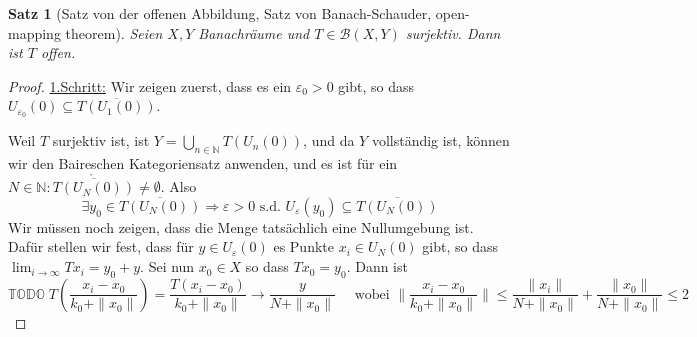 \documentclass[ngerman]{report}
\theoremstyle{plain}%
\newtheorem{thm}{Satz}[chapter]
\theoremstyle{definition}%
\theoremstyle{myStyle}
\newcommand{\N}{\mathbb{N}}
\newcommand{\BS}[1][X,Y]{\mathcal{B}(#1)} %
\newcommand{\norm}[1]{\|#1\|}
\newcommand{\df}[1][]{%
	\overset{#1}{\Rightarrow}
}
\newcommand{\TODO}{\text{$\mathbb{TODO}$}}
\begin{document}
	\begin{thm}[Satz von der offenen Abbildung, Satz von Banach-Schauder, open-mapping theorem]
		Seien $X,Y$ Banachräume und $T\in \BS$ surjektiv. Dann ist $T$ offen.	
	\end{thm}
	\begin{proof}
		
		\underline{1.Schritt:} 
		Wir zeigen zuerst, dass es ein $\varepsilon_0 > 0$ gibt, so dass $U_{\varepsilon_0}(0) \subseteq \overline{T(U_1(0))}$.\par 
		Weil $T$ surjektiv ist, ist $Y = \bigcup_{n\in \N} T(U_n(0))$, und da $Y$ vollständig ist, können wir den Baireschen Kategoriensatz anwenden, und es ist für ein $N\in\N: \mathring{\overline{T(U_N(0))}} \not = \emptyset$.
		 Also $$\exists y_0 \in \overline{T(U_N(0))}\df \varepsilon > 0 \text{ s.d. }U_\varepsilon(y_0) \subseteq \overline{T(U_N(0))}$$
		 Wir müssen noch zeigen, dass die Menge tatsächlich eine Nullumgebung ist.
		 Dafür stellen wir fest, dass für $y \in U_{\varepsilon}(0)$ es Punkte $x_i \in U_{N}(0)$ gibt, so dass $\lim_{i\to \infty} Tx_i=y_0+y$. Sei nun $x_0\in X$ so dass $Tx_0 = y_0$. Dann ist 
		 $$\TODO\; T\left(\frac{x_i-x_0}{k_0+\|x_0\|}\right)=\frac{T(x_i-x_0)}{k_0+\|x_0\|}\to \frac{y}{N+\|x_0\|}\quad\text{ wobei } \norm{\frac{x_i-x_0}{k_0+\|x_0\|}}\leq \frac{\|x_i\|}{N+\|x_0\|}+\frac{\|x_0\|}{N+\|x_0\|} \leq 2$$
		 

\end{proof}
\end{document}
